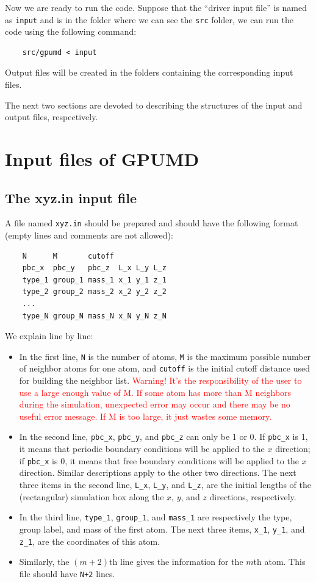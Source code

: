\documentclass[12pt,a4paper]{report}
\begin{document}
Now we are ready to run the code. Suppose that the ``driver input file'' is named as \verb"input" and is in the folder where we can see the \verb"src" folder, we can run the code using the following command:
\begin{verbatim}
    src/gpumd < input
\end{verbatim}
Output files will be created in the folders containing the corresponding input files.

The next two sections are devoted to describing the structures of the input and output files, respectively.




\section{Input files of GPUMD}


\subsection{The xyz.in input file}

A file named \verb"xyz.in" should be prepared and should have the following format (empty lines and comments are not allowed):
\begin{verbatim}
    N      M       cutoff
    pbc_x  pbc_y   pbc_z  L_x L_y L_z
    type_1 group_1 mass_1 x_1 y_1 z_1
    type_2 group_2 mass_2 x_2 y_2 z_2
    ...
    type_N group_N mass_N x_N y_N z_N
\end{verbatim}
We explain line by line:
\begin{itemize}
\item In the first line, \verb"N" is the number of atoms, \verb"M" is the maximum possible number of neighbor atoms for one atom, and \verb"cutoff" is the initial cutoff distance used for building the neighbor list. \textcolor{red}{Warning! It's the responsibility of the user to use a large enough value of M. If some atom has more than M neighbors during the simulation, unexpected error may occur and there may be no useful error message. If M is too large, it just wastes some memory. } 
\item In the second line, \verb"pbc_x",  \verb"pbc_y", and \verb"pbc_z" can only be 1 or 0. If \verb"pbc_x" is 1, it means that periodic boundary conditions will be applied to the $x$ direction; if \verb"pbc_x" is 0, it means that free boundary conditions will be applied to the $x$ direction. Similar descriptions apply to the other two directions. The next three items in the second line, \verb"L_x", \verb"L_y", and \verb"L_z", are the initial lengths of the (rectangular) simulation box along the $x$, $y$, and $z$ directions, respectively.
\item In the third line, \verb"type_1", \verb"group_1", and \verb"mass_1" are respectively the type, group label, and mass of the first atom. The next three items, \verb"x_1", \verb"y_1", and \verb"z_1", are the coordinates of this atom.
\item Similarly, the $(m+2)$th line gives the information for the $m$th atom. This file should have \verb"N+2" lines.
\end{itemize}
\end{document}
